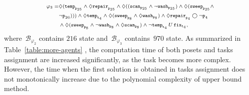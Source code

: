 \begin{equation}\scriptsize
\label{eq:task3}
\begin{aligned}
\varphi_3 = &\Diamond (\texttt{temp}_{\texttt{p}_{25}} \land\Diamond \texttt{repair}_{\texttt{p}_{25}}\wedge \Diamond ((\texttt{scan}_{\texttt{p}_{25}}\wedge
\lnot \texttt{wash}_{\texttt{p}_{25}} ) \wedge\Diamond (\texttt{sweep}_{\texttt{p}_{25}} \land\\
& \lnot{\texttt{p}_{26}} ))) \wedge  \Diamond\texttt{temp}_{\texttt{t}_4}\wedge  \Diamond (\texttt{sweep}_{\texttt{p}_{8}} \wedge \Diamond \texttt{wash}_{\texttt{p}_{8}} )\land \Diamond \texttt{repair}_{\texttt{p}_4} \bigcirc \lnot \texttt{p}_4\\
& \wedge \Diamond ( \texttt{sweep}_{\texttt{p}_{8}} \wedge \lnot \texttt{wash}_{\texttt{p}_{8}} \wedge\Diamond \texttt{scan}_{\texttt{p}_{8}} )
\wedge \lnot \texttt{temp}_{\texttt{t}_4} \,U \, \texttt{fix}_{\texttt{t}_{4}},
\end{aligned}
\end{equation}
where~$\mathcal{B}_{\varphi_2}$ contains $216$ state
	 and~$\mathcal{B}_{\varphi_3}$ contains~$970$ state.
	As summarized in Table~\ref{table:more-agents} , the computation time of
	 both posets and tasks assignment are increased significantly, as the task becomes more
	 complex. 
	 However, the time when the first solution is obtained in tasks assignment does not monotonically increase due to
	 the polynomial complexity of upper bound method. 
 


